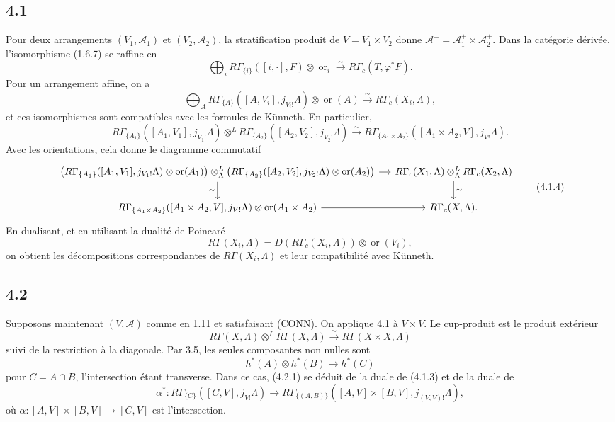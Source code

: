 \documentclass[11pt]{article}
\theoremstyle{definition}
\newcommand{\ornt}{\operatorname{or}}
\begin{document}
\subsection*{4.1}
Pour deux arrangements $(V_1,\mathcal A_1)$ et $(V_2,\mathcal A_2)$, la stratification produit de $V=V_1\times V_2$ donne $\mathcal A^+=\mathcal A_1^+\times\mathcal A_2^+$. Dans la catégorie dérivée, l'isomorphisme (1.6.7) se raffine en
\begin{equation}
\bigoplus_i R\Gamma_{\{i\}}([i,\cdot],F)\otimes\ornt_i\xrightarrow{\sim}R\Gamma_c(T,\varphi^*F).\tag{4.1.1}
\end{equation}
Pour un arrangement affine, on a
\begin{equation}
\bigoplus_A R\Gamma_{\{A\}}([A,V_i],j_{V_i!}\Lambda)\otimes\ornt(A)\xrightarrow{\sim}R\Gamma_c(X_i,\Lambda),\tag{4.1.2}
\end{equation}
et ces isomorphismes sont compatibles avec les formules de Künneth. En particulier,
\begin{equation}
R\Gamma_{\{A_1\}}([A_1,V_1],j_{V_1!}\Lambda)\otimes^L R\Gamma_{\{A_2\}}([A_2,V_2],j_{V_2!}\Lambda)
\xrightarrow{\sim}R\Gamma_{\{A_1\times A_2\}}([A_1\times A_2,V],j_{V!}\Lambda).\tag{4.1.3}
\end{equation}
Avec les orientations, cela donne le diagramme commutatif
\begin{equation}
\begin{tikzcd}[column sep=small]
\left(R\Gamma_{\{A_1\}}([A_1,V_1],j_{V_1!}\Lambda)\otimes\ornt(A_1)\right)
\otimes^L_
\Lambda
\left(R\Gamma_{\{A_2\}}([A_2,V_2],j_{V_2!}\Lambda)\otimes\ornt(A_2)\right)
\arrow[r]\arrow[d,"\sim"']
& R\Gamma_c(X_1,\Lambda)\otimes^L_\Lambda R\Gamma_c(X_2,\Lambda)\arrow[d,"\sim"]\\
R\Gamma_{\{A_1\times A_2\}}([A_1\times A_2,V],j_{V!}\Lambda)\otimes\ornt(A_1\times A_2)\arrow[r]
& R\Gamma_c(X,\Lambda).
\end{tikzcd}\tag{4.1.4}
\end{equation}
En dualisant, et en utilisant la dualité de Poincaré
\[
R\Gamma(X_i,\Lambda)=D(R\Gamma_c(X_i,\Lambda))\otimes\ornt(V_i),
\]
on obtient les décompositions correspondantes de $R\Gamma(X_i,\Lambda)$ et leur compatibilité avec Künneth.

\subsection*{4.2}
Supposons maintenant $(V,\mathcal A)$ comme en 1.11 et satisfaisant \textup{(CONN)}. On applique 4.1 à $V\times V$. Le cup-produit est le produit extérieur
\[
R\Gamma(X,\Lambda)\otimes^L R\Gamma(X,\Lambda)\xrightarrow{\sim}R\Gamma(X\times X,\Lambda)
\]
suivi de la restriction à la diagonale. Par 3.5, les seules composantes non nulles sont
\begin{equation}
h^*(A)\otimes h^*(B)\longrightarrow h^*(C)\tag{4.2.1}
\end{equation}
pour $C=A\cap B$, l'intersection étant transverse. Dans ce cas, (4.2.1) se déduit de la duale de (4.1.3) et de la duale de
\[
\alpha^*:R\Gamma_{\{C\}}([C,V],j_{V!}\Lambda)\to R\Gamma_{\{(A,B)\}}([A,V]\times[B,V],j_{(V,V)!}\Lambda),
\]
où $\alpha:[A,V]\times[B,V]\to[C,V]$ est l'intersection.
\end{document}
